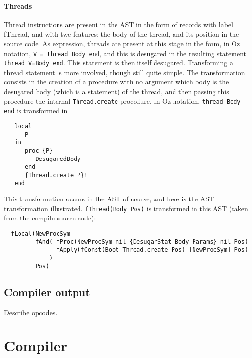 \documentclass[a4paper]{memoir}
\begin{document}
\subsubsection{Threads}
Thread instructions are present in the AST in the form of records with label fThread, and with twe features: the body of the thread, and its position in the source code.
As expression, threads are present at this stage in the form, in Oz notation, \lstinline!V = thread Body end!, and this is desugared in the resulting statement \lstinline!thread V=Body end!. This statement is then itself desugared.
Transforming a thread statement is more involved, though still quite simple. The transformation consists in the creation of a procedure with no argument which body is the desugared body (which is a statement) of the thread, and then passing this procedure the internal \lstinline!Thread.create! procedure.
In Oz notation, \lstinline!thread Body end! is transformed in 
\begin{lstlisting}
   local 
      P 
   in 
      proc {P} 
         DesugaredBody 
      end 
      {Thread.create P}!
   end
\end{lstlisting}
This transformation occurs in the AST of course, and here is the AST transformation illustrated. \lstinline!fThread(Body Pos)! is transformed in this AST (taken from the compile source code):
\begin{lstlisting}
  fLocal(NewProcSym 
         fAnd( fProc(NewProcSym nil {DesugarStat Body Params} nil Pos) 
               fApply(fConst(Boot_Thread.create Pos) [NewProcSym] Pos)
             ) 
         Pos)
\end{lstlisting}
\section{Compiler output}
Describe opcodes.



\chapter{Compiler}
\end{document}
